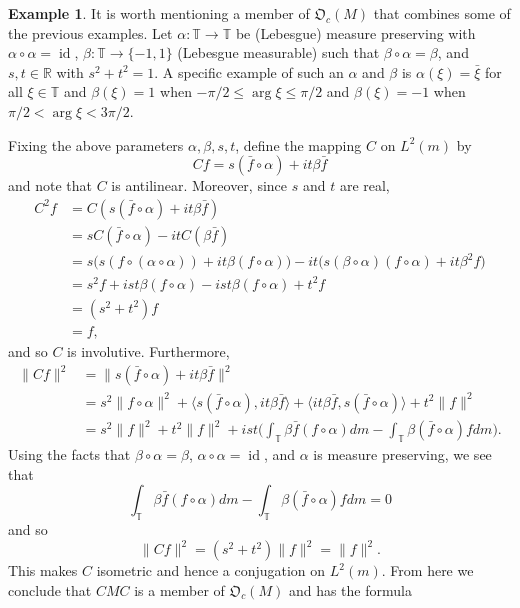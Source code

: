 \documentclass{dis}
\theoremstyle{plain}
\theoremstyle{definition}
\newtheorem{Example}[equation]{Example}
\def\R{\mathbb{R}}
\def\T{\mathbb{T}}
\renewcommand{\leq}{\leqslant}
\newcommand{\0}{{\color{lightgray}0}}
\begin{document}
\begin{Example}\label{Ealphabetatsst}
It is worth mentioning a member of $\mathfrak{O}_c(M)$ that combines some of the  previous examples. Let $\alpha: \T \to \T$ be  (Lebesgue) measure preserving with $\alpha \circ \alpha = \operatorname{id}$, $\beta: \T \to \{-1, 1\}$ (Lebesgue measurable) such that $\beta \circ \alpha = \beta$, and $s, t \in \R$ with $s^2 + t^2 = 1$. A specific example of such an $\alpha$ and $\beta$ is  $\alpha(\xi) = \bar \xi$  for all $\xi \in \T$ and $\beta(\xi) = 1$ when $- \pi/2 \leq \arg \xi  \leq \pi/2$ and $\beta(\xi) = -1$ when $\pi/2 < \arg \xi < 3\pi/2$.


Fixing the above parameters $\alpha, \beta, s, t$,  define the mapping $C$ on $L^2(m)$ by 
$$C f = s (\bar f \circ \alpha) + i t \beta \bar f$$ and note that $C$ is antilinear. Moreover, since $s$ and $t$ are real, 
\begin{align*}
C^2 f & = C(s (\bar f \circ \alpha) + i t \beta \bar f)\\
& = s C(\bar f \circ \alpha) - i t C(\beta \bar f)\\
& = s \big(s  (f \circ (\alpha \circ \alpha))+ i t \beta  (f \circ \alpha)\big)- i t \big(s (\beta \circ \alpha) (f \circ \alpha) + i t \beta^2 f\big)\\
& = s^2 f + i s t \beta (f \circ\alpha) - i s t \beta (f \circ \alpha) + t^2 f\\
& = (s^2 + t^2) f\\
& = f,
\end{align*}
and so $C$ is involutive. Furthermore, 
\begin{align*}
\|C f\|^2 & = \|s (\bar f \circ \alpha) + i t \beta \bar f\|^2\\
& = s^2 \|f \circ \alpha\|^2 + \big\langle s (\bar f \circ \alpha), i t \beta \bar f\big\rangle + \big\langle i t \beta \bar f, s (\bar f \circ \alpha)\big\rangle + t^2 \|f\|^2\\
& = s^2 \|f\|^2 + t^2 \|f\|^2 + i s t\Big(\int_{\T} \beta \bar f (f \circ \alpha)dm - \int_{\T}\beta (\bar f \circ \alpha) f dm\Big).
\end{align*}
Using the facts that $\beta \circ \alpha = \beta$, $\alpha \circ \alpha = \operatorname{id}$, and $\alpha$ is measure preserving, we see that 
$$\int_{\T} \beta \bar f (f \circ \alpha)dm - \int_{\T}  \beta (\bar f \circ \alpha) f dm = 0$$ and so 
$$\|C f\|^2 = (s^2 + t^2) \|f\|^2 = \|f\|^2.$$ This makes $C$ isometric and hence a conjugation on $L^2(m)$. 
From here we conclude that $C M C$ is a member of $\mathfrak{O}_c(M)$ and has the formula 

\end{Example}
\end{document}
